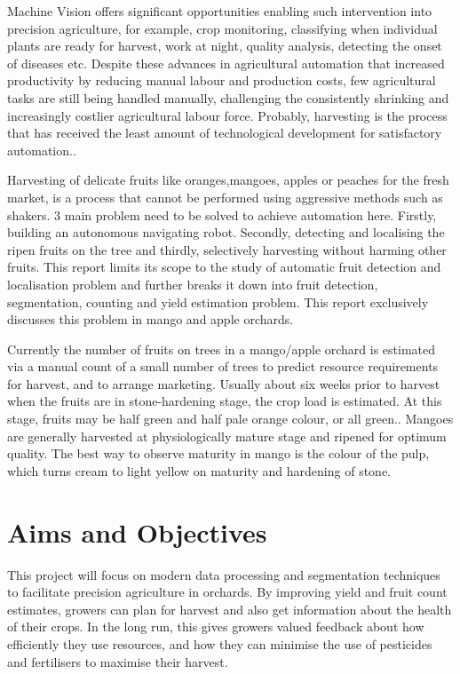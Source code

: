 \documentclass[12pt]{article}
\begin{document}
Machine Vision offers significant opportunities enabling such intervention into precision agriculture, for example, crop monitoring, classifying when individual plants are ready for harvest\cite{article_Barnes}, work at night, quality analysis, detecting the onset of diseases etc. 
Despite these advances in agricultural automation that increased productivity by reducing manual labour and production costs, few agricultural tasks are still being handled manually, challenging the consistently shrinking and increasingly costlier agricultural labour force\cite{Kapach2012ComputerVF}. Probably, harvesting is the process that has received the least amount of technological development for satisfactory automation.\cite{article}.

Harvesting of delicate fruits like oranges,mangoes, apples or peaches for the fresh market, is a process that cannot be performed using aggressive methods such as shakers. 3 main problem need to be solved to achieve automation here. Firstly, building an autonomous navigating robot. Secondly, detecting and localising the ripen fruits on the tree and thirdly, selectively harvesting without harming other fruits. This report limits its scope to the study of automatic fruit detection and localisation problem and further breaks it down into fruit detection, segmentation, counting and yield estimation problem. This report exclusively discusses this problem in mango and apple orchards.

Currently the number of fruits on trees in a mango/apple orchard is estimated via a manual count of a small number of trees to predict resource requirements for harvest, and to arrange marketing\cite{article_Payne}. Usually about six weeks prior to harvest when the fruits are in stone-hardening stage, the crop load is estimated. At this stage, fruits may be half green and half pale orange colour, or all green.\cite{PAYNE2014160}. Mangoes are generally harvested at physiologically mature stage and ripened for optimum quality. The best way to observe maturity in mango is the colour of the pulp, which turns cream to light yellow on maturity and hardening
of stone\cite{mango_harvesting_in}.


\section{Aims and Objectives}
    
This project will focus on modern data processing and segmentation techniques to facilitate precision agriculture in orchards. By improving yield and fruit count estimates, growers can plan for harvest and also get information about the health of their crops. In the long run, this gives growers valued feedback about how efficiently they use resources, and how they can minimise the use of pesticides and fertilisers to maximise their harvest\cite{stein2016improving}.
\end{document}
